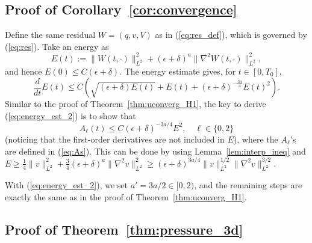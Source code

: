 \documentclass[reqno,10pt]{amsart}
\theoremstyle{definition}
\theoremstyle{remark}
\numberwithin{equation}{section}
\begin{document}
\subsection{Proof of Corollary~\ref{cor:convergence}} \label{subsec:cor:convergence}

Define the same residual $W=(q,v,V)$ as in (\ref{eq:res_def}), which is governed by (\ref{eq:res}). Take an energy as
\[
    E(t):=\|W(t,\cdot)\|_{L^2}^2 + (\epsilon+\delta)^a \|\nabla^2 W(t,\cdot)\|_{L^2}^2,
\]
and hence $E(0)\le C(\epsilon+\delta)$. The energy estimate gives, for $t\in[0,T_0]$,
\begin{equation} \label{eq:energy_est_2}
    \frac{d}{dt}E(t) \le C\left( \sqrt{(\epsilon+\delta)E(t)} + E(t) + (\epsilon+\delta)^{-\frac{3a}{4}}E(t)^2 \right).
\end{equation}
Similar to the proof of Theorem~\ref{thm:uconverg_H1}, the key to derive (\ref{eq:energy_est_2}) is to show that
\[ A_\ell(t) \le C(\epsilon+\delta)^{-3a/4}E^2, \quad \ell \in \{0,2\} \]
(noticing that the first-order derivatives are not included in $E$), where the $A_\ell$'s are defined in (\ref{eq:As}). This can be done by using Lemma~\ref{lem:interp_ineq} and $E\ge \frac{1}{4}\|v\|_{L^2}^2+\frac{3}{4}(\epsilon+\delta)^a\|\nabla^2v\|_{L^2}^2\ge (\epsilon+\delta)^{3a/4}\|v\|_{L^2}^{1/2}\|\nabla^2v\|_{L^2}^{3/2}$.

With (\ref{eq:energy_est_2}), we set $a'=3a/2\in[0,2)$, and the remaining steps are exactly the same as in the proof of Theorem~\ref{thm:uconverg_H1}.

\subsection{Proof of Theorem~\ref{thm:pressure_3d}} \label{subsec:thm:pressure_3d}
\end{document}
